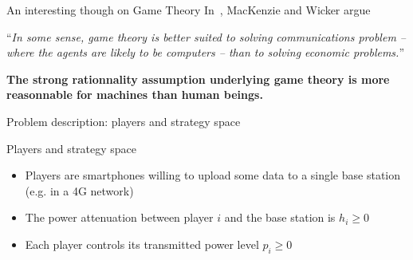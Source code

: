 \begin{frame}{An interesting though on Game Theory}
    In~\cite{mackenzie01}, MacKenzie and Wicker argue

    \begin{center}
        ``\textit{In some sense, game theory is better suited to solving communications
        problem -- where the agents are likely to be computers -- than to solving economic
        problems.}''
    \end{center}
    
    \vspace{0.5cm}
    \textbf{{\color{green}The strong rationnality assumption underlying game theory is more
    reasonnable for machines than human beings.}}
\end{frame}


\begin{frame}{Problem description: players and strategy space}
    \begin{exampleblock}{Players and strategy space}
        \begin{itemize}
            \pause
            \item Players are smartphones willing to upload some data to a single base station (e.g. in
            a 4G network)
            \pause
            \item The power attenuation between player $i$ and the base station is $h_i \ge 0$
            \pause
            \item Each player controls its transmitted power level $p_i \ge 0$
        \end{itemize}
    \end{exampleblock}
\end{frame}

